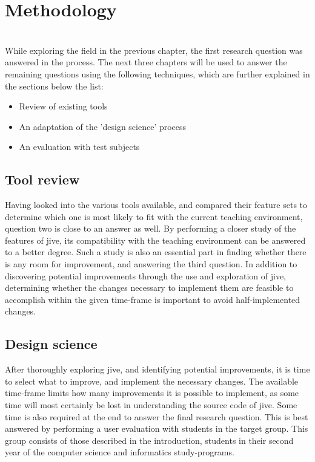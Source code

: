 \chapter{Methodology}\label{methodology}
~\\
While exploring the field in the previous chapter, the first research question was answered in the process.
The next three chapters will be used to answer the remaining questions using the following techniques, which are further explained in the sections below the list:
~\\
\begin{itemize}
	\item{Review of existing tools}
	\item{An adaptation of the 'design science' process}%
	\item{An evaluation with test subjects}
\end{itemize}

\section{Tool review}\label{methReview}
Having looked into the various tools available, and compared their feature sets to determine which one is most likely to fit with the current teaching environment, question two is close to an answer as well.
By performing a closer study of the features of \gls{jive}, its compatibility with the teaching environment can be answered to a better degree.
Such a study is also an essential part in finding whether there is any room for improvement, and answering the third question.
In addition to discovering potential improvements through the use and exploration of \gls{jive}, determining whether the changes necessary to implement them are feasible to accomplish within the given time-frame is important to avoid half-implemented changes.
~\\

\section{Design science}\label{methDesign}
After thoroughly exploring \gls{jive}, and identifying potential improvements, it is time to select what to improve, and implement the necessary changes.
The available time-frame limits how many improvements it is possible to implement, as some time will most certainly be lost in understanding the source code of \gls{jive}.
Some time is also required at the end to answer the final research question.
This is best answered by performing a user evaluation with students in the target group.
This group consists of those described in the introduction, students in their second year of the computer science and informatics study-programs.
~\\

